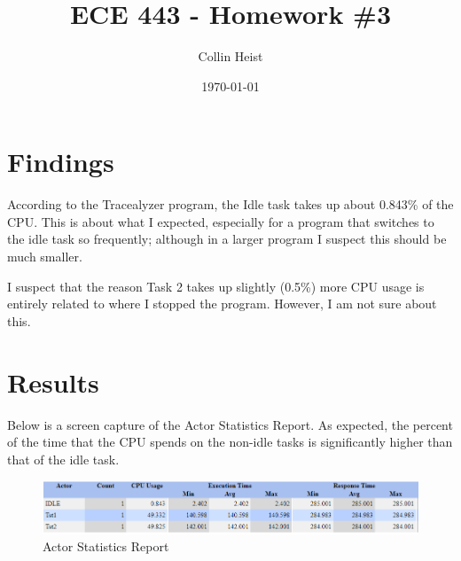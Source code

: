 \documentclass[a4paper, 12pt]{article}
\begin{document}
\title{ECE 443 - Homework \#3}
\author{Collin Heist}
\date{\today}
\maketitle
{}

\section{Findings}
According to the Tracealyzer program, the Idle task takes up about 0.843\% of the CPU. This is about what I expected, especially for a program that switches to the idle task so frequently; although in a larger program I suspect this should be much smaller.

I suspect that the reason Task 2 takes up slightly (0.5\%) more CPU usage is entirely related to where I stopped the program. However, I am not sure about this.

\section{Results}
Below is a screen capture of the Actor Statistics Report. As expected, the percent of the time that the CPU spends on the non-idle tasks is significantly higher than that of the idle task.

\begin{figure}[H]
\centering
\includegraphics[width=\textwidth]{pic.png}
\caption{Actor Statistics Report}
\label{fig:img00}
\end{figure}
\end{document}
